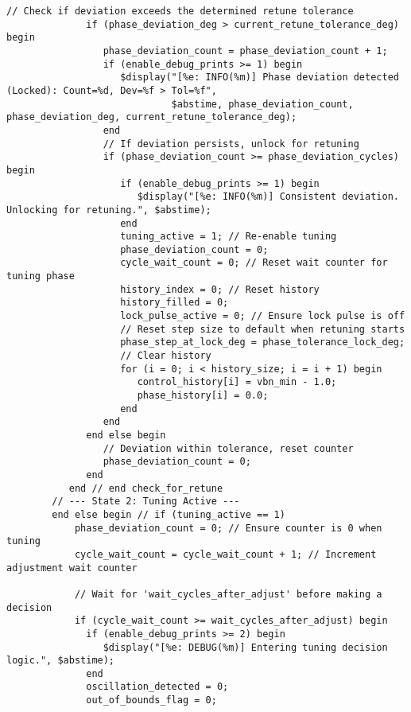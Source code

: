\begin{lstlisting}[caption={Verilog-A Generic Vb Tuner Implementation}]
              // Check if deviation exceeds the determined retune tolerance
              if (phase_deviation_deg > current_retune_tolerance_deg) begin
                 phase_deviation_count = phase_deviation_count + 1;
                 if (enable_debug_prints >= 1) begin
                    $display("[%e: INFO(%m)] Phase deviation detected (Locked): Count=%d, Dev=%f > Tol=%f",
                             $abstime, phase_deviation_count, phase_deviation_deg, current_retune_tolerance_deg);
                 end
                 // If deviation persists, unlock for retuning
                 if (phase_deviation_count >= phase_deviation_cycles) begin
                    if (enable_debug_prints >= 1) begin
                       $display("[%e: INFO(%m)] Consistent deviation. Unlocking for retuning.", $abstime);
                    end
                    tuning_active = 1; // Re-enable tuning
                    phase_deviation_count = 0;
                    cycle_wait_count = 0; // Reset wait counter for tuning phase
                    history_index = 0; // Reset history
                    history_filled = 0;
                    lock_pulse_active = 0; // Ensure lock pulse is off
                    // Reset step size to default when retuning starts
                    phase_step_at_lock_deg = phase_tolerance_lock_deg;
                    // Clear history
                    for (i = 0; i < history_size; i = i + 1) begin
                       control_history[i] = vbn_min - 1.0;
                       phase_history[i] = 0.0;
                    end
                 end
              end else begin
                 // Deviation within tolerance, reset counter
                 phase_deviation_count = 0;
              end
           end // end check_for_retune
        // --- State 2: Tuning Active ---
        end else begin // if (tuning_active == 1)
            phase_deviation_count = 0; // Ensure counter is 0 when tuning
            cycle_wait_count = cycle_wait_count + 1; // Increment adjustment wait counter

            // Wait for 'wait_cycles_after_adjust' before making a decision
            if (cycle_wait_count >= wait_cycles_after_adjust) begin
              if (enable_debug_prints >= 2) begin
                 $display("[%e: DEBUG(%m)] Entering tuning decision logic.", $abstime);
              end
              oscillation_detected = 0;
              out_of_bounds_flag = 0;


\end{lstlisting}
